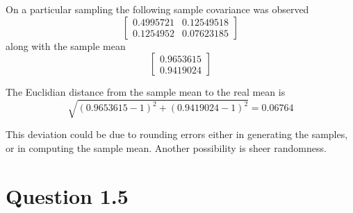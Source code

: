 \documentclass[a4paper, oneside, final]{memoir}
\begin{document}
On a particular sampling the following sample covariance was observed
\[
\left[\begin{matrix}0.4995721&0.12549518\\0.1254952&0.07623185\end{matrix}\right]
\]
along with the sample mean
\[
\left[\begin{matrix}0.9653615\\0.9419024\end{matrix}\right]
\]

The Euclidian distance from the sample mean to the real mean is
\[
\sqrt{(0.9653615-1)^2+(0.9419024-1)^2}=0.06764
\]

This deviation could be due to rounding errors either in generating
the samples, or in computing the sample mean.  Another possibility is
sheer randomness.

\section*{Question 1.5}
\end{document}
